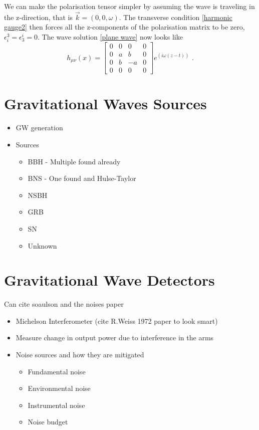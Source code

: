 \documentclass[11pt]{cuthesis}
\newcommand{\mn}{_{\mu\nu}}
\newcommand{\fs}{\text{ .}}
\begin{document}
We can make the polarisation tensor simpler by assuming the wave is traveling in the z-direction, that is $\vec{k} = (0,0,\omega)$. The transverse condition \ref{harmonic gauge2} then forces all the z-components of the polarisation matrix to be zero, $\epsilon^3_i = \epsilon^i_3 = 0$. The wave solution \ref{plane wave} now looks like
\[
h\mn (x)
=
\begin{bmatrix}
0 & 0 & 0 & 0 \\
0 & a & b & 0 \\
0 & b & -a & 0 \\
0 & 0 & 0 & 0 
\end{bmatrix}
e^{(i\omega (z-t))} \fs
\] 

\newpage
\section{Gravitational Waves Sources} 
\begin{itemize}
\item GW generation 
\item Sources
\begin{itemize}
\item BBH - Multiple found already
\item BNS - One found and Hulse-Taylor
\item NSBH
\item GRB 
\item SN
\item Unknown
\end{itemize}
\end{itemize}
\section{Gravitational Wave Detectors} 
Can cite soaulson and the noises paper
\begin{itemize}
\item Michelson Interferometer (cite R.Weiss 1972 paper to look smart)
\item Measure change in output power due to interference in the arms
\item Noise sources and how they are mitigated
\begin{itemize}
\item Fundamental noise
\item Environmental noise
\item Instrumental noise
\item Noise budget
\end{itemize}
\end{itemize}
\end{document}
